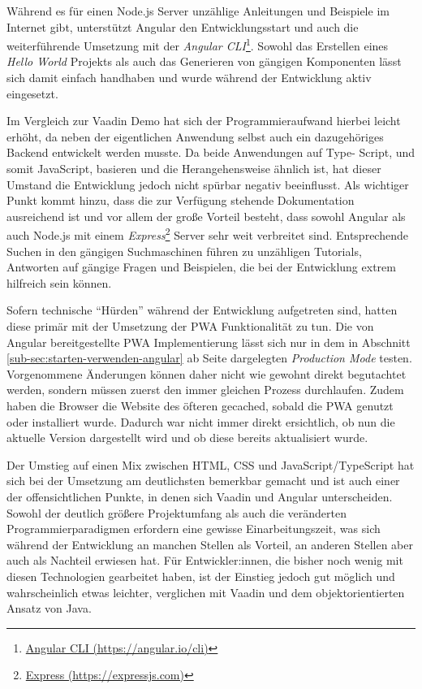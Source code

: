 \documentclass[a4paper,12pt,twoside]{scrreprt}
\begin{document}
Während es für einen Node.js Server unzählige Anleitungen und Beispiele im Internet gibt, unterstützt Angular den Entwicklungsstart und auch die weiterführende Umsetzung mit der \textit{Angular CLI}\footnote{\href{https://angular.io/cli}{Angular CLI (https://angular.io/cli)}}. Sowohl das Erstellen eines \textit{Hello World} Projekts als auch das Generieren von gängigen Komponenten lässt sich damit einfach handhaben und wurde während der Entwicklung aktiv eingesetzt.

\medskip

Im Vergleich zur Vaadin Demo hat sich der Programmieraufwand hierbei leicht erhöht, da neben der eigentlichen Anwendung selbst auch ein dazugehöriges Backend entwickelt werden musste. Da beide Anwendungen auf Type- Script, und somit JavaScript, basieren und die Herangehensweise ähnlich ist, hat dieser Umstand die Entwicklung jedoch nicht spürbar negativ beeinflusst. Als wichtiger Punkt kommt hinzu, dass die zur Verfügung stehende Dokumentation ausreichend ist und vor allem der große Vorteil besteht, dass sowohl Angular als auch Node.js mit einem \textit{Express}\footnote{\href{https://expressjs.com/}{Express (https://expressjs.com)}} Server sehr weit verbreitet sind. Entsprechende Suchen in den gängigen Suchmaschinen führen zu unzähligen Tutorials, Antworten auf gängige Fragen und Beispielen, die bei der Entwicklung extrem hilfreich sein können.

\medskip

Sofern technische \enquote{Hürden} während der Entwicklung aufgetreten sind, hatten diese primär mit der Umsetzung der \ac{PWA} Funktionalität zu tun. Die von Angular bereitgestellte \ac{PWA} Implementierung lässt sich nur in dem in Abschnitt \ref{sub-sec:starten-verwenden-angular} ab Seite \pageref{sub-sec:starten-verwenden-angular} dargelegten \textit{Production Mode} testen. Vorgenommene Änderungen können daher nicht wie gewohnt direkt begutachtet werden, sondern müssen zuerst den immer gleichen Prozess durchlaufen. Zudem haben die Browser die Website des öfteren gecached, sobald die \ac{PWA} genutzt oder installiert wurde. Dadurch war nicht immer direkt ersichtlich, ob nun die aktuelle Version dargestellt wird und ob diese bereits aktualisiert wurde.

\medskip

Der Umstieg auf einen Mix zwischen HTML, \ac{CSS} und JavaScript/TypeScript hat sich bei der Umsetzung am deutlichsten bemerkbar gemacht und ist auch einer der offensichtlichen Punkte, in denen sich Vaadin und Angular unterscheiden. Sowohl der deutlich größere Projektumfang als auch die veränderten Programmierparadigmen erfordern eine gewisse Einarbeitungszeit, was sich während der Entwicklung an manchen Stellen als Vorteil, an anderen Stellen aber auch als Nachteil erwiesen hat. Für Entwickler:innen, die bisher noch wenig mit diesen Technologien gearbeitet haben, ist der Einstieg jedoch gut möglich und wahrscheinlich etwas leichter, verglichen mit Vaadin und dem objektorientierten Ansatz von Java.
\end{document}
